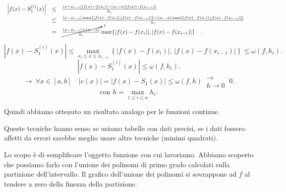 \[
\begin{array}{lcl}
\left|f(x) - S^{(i)}_1(x)\right| & \leq & 
\frac{(x-x_{i-1})|f(x)-f(x_i)|-(x_i-x)|f(x)-f(x_{i-1})|}{h_i}^{\phantom{(1)}} \\
& \leq & \frac{(x-x_{i-1})\max\{|f(x)-f(x_i)|,|f(x)-f(x_{i-1})|\}
+(x_i-x) \max\{|f(x)-f(x_i)|,|f(x)-f(x_{i-1})|\}}{h_i}^{\phantom{(1)}} \\
& = &  \cancelto{1}{\frac{(x-x_{i-1})+(x_i-x)}{h_i}}
\max\{|f(x)-f(x_i)|,|f(x)-f(x_{i-1})|\}^{\phantom{(1)}}.
\end{array}
\]

\[
\left|f(x) - S^{(i)}_1(x)\right|  \leq 
\max_{x_i \leq x \leq x_{i-1}}\left\{|f(x)-f(x_i)|,\,|f(x)-
f(x_{i-1})|\right\} \leq \omega(f,h_i).
\]
\[
\left|f(x) - S^{(i)}_1(x)\right|  \leq \omega(f,h_i).
\]
\[
\longrightarrow \ \forall x \in [a,b] \quad |e(x)| =  \left|f(x) - 
S_1(x)\right| \leq \omega(f,h)\ \substack{\longrightarrow \\ h \to 0} \ 0.
\]
\[\textrm{con } h = \max_{1 \leq i \leq n}h_i.\]

Quindi abbiamo ottenuto un risultato analogo per le funzioni continue.

\begin{osse}
Queste tecniche hanno senso se usiamo tabelle con dati precisi, se i dati
fossero affetti da errori sarebbe meglio usare altre tecniche (minimi
quadrati).
\end{osse}

Lo scopo è di semplificare l'oggetto funzione con cui lavoriamo. Abbiamo
scoperto che possiamo farlo con l'unione dei polinomi di primo grado
calcolati sulla partizione dell'intervallo. Il grafico dell'unione dei 
polinomi si sovrappone ad $f$ al tendere a zero della finezza della
partizione.

